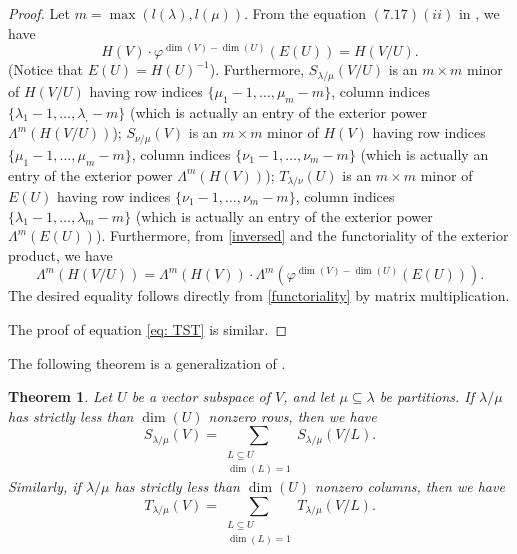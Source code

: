 \documentclass[12pt,a4paper]{report}
\newtheorem{theorem}{Theorem}[chapter]
\theoremstyle{definition}
\theoremstyle{remark}
\theoremstyle{definition}
\begin{document}
\begin{proof}
    Let $m = \max(l(\lambda), l(\mu))$. From the equation $(7.17) (ii)$ in \cite{macdonald_schur_1992}, we have\
    \begin{equation}\label{inversed}
        H(V)\cdot \varphi^{\dim(V) -\dim(U)}(E(U)) = H(V/U).
    \end{equation}
    (Notice that $E(U) = H(U)^{-1}$). Furthermore, $S_{\lambda/\mu}(V/U)$ is an $m\times m$ minor of $H(V/U)$ having row indices $\{\mu_1-1, \ldots, \mu_m -m\}$, column indices $\{\lambda_1 - 1, \ldots, \lambda_{,} - m\}$ (which is actually an entry of the exterior power $\Lambda^{m}(H(V/U))$); $S_{\nu/\mu}(V)$ is an $m\times m$ minor of $H(V)$ having row indices $\{\mu_1-1, \ldots, \mu_m - m\}$, column indices $\{\nu_1 - 1, \ldots, \nu_{m} - m\}$ (which is actually an entry of the exterior power $\Lambda^{m}(H(V))$); $T_{\lambda/\nu}(U)$ is an $m\times m$ minor of $E(U)$ having row indices $\{\nu_1-1, \ldots, \nu_{m} -m\}$, column indices $\{\lambda_1 - 1, \ldots, \lambda_{m} - m\}$ (which is actually an entry of the exterior power $\Lambda^{m}(E(U))$). Furthermore, from \eqref{inversed} and the functoriality of the exterior product, we have \begin{equation}\label{functoriality}
        \Lambda^{m}(H(V/U)) = \Lambda^{m}(H(V))\cdot \Lambda^{m}(\varphi^{\dim(V) -\dim(U)}(E(U))).
    \end{equation}
    The desired equality follows directly from \eqref{functoriality} by matrix multiplication. 

    The proof of equation \eqref{eq: TST} is similar.
\end{proof}
The following theorem is a generalization of \cite[Conjecture (7.25)]{macdonald_schur_1992}.
\begin{theorem}\label{gen_of_7.25}
Let $U$ be a vector subspace of $V$, and let $\mu\subseteq \lambda$ be partitions.  If $\lambda/\mu$ has strictly less than $\dim(U)$ nonzero rows, then we have
\begin{equation*}
    S_{\lambda/\mu}(V) = \sum\limits_{\substack{L\subseteq U\\
    \dim(L) = 1}}S_{\lambda/\mu}(V/L).  
\end{equation*}
Similarly, if $\lambda/\mu$ has strictly less than $\dim (U)$ nonzero columns, then we have 
\begin{equation*}
    T_{\lambda/\mu}(V) = \sum\limits_{\substack{L\subseteq U\\
    \dim(L) = 1}}T_{\lambda/\mu}(V/L). 
\end{equation*}
\end{theorem}
\end{document}
